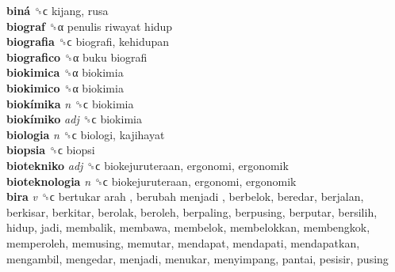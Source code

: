 \textbf{biná} ␝ϲ  kijang, rusa  \\
\textbf{biograf} ␝α   penulis riwayat hidup   \\
\textbf{biografia} ␝ϲ  biografi, kehidupan  \\
\textbf{biografico} ␝α   buku biografi   \\
\textbf{biokimica} ␝α  biokimia  \\
\textbf{biokimico} ␝α  biokimia  \\
\textbf{biokímika} \emph{n}  ␝ϲ  biokimia  \\
\textbf{biokímiko} \emph{adj}  ␝ϲ  biokimia  \\
\textbf{biologia} \emph{n}  ␝ϲ  biologi, kajihayat  \\
\textbf{biopsia} ␝ϲ  biopsi  \\
\textbf{biotekniko} \emph{adj}  ␝ϲ  biokejuruteraan, ergonomi, ergonomik  \\
\textbf{bioteknologia} \emph{n}  ␝ϲ  biokejuruteraan, ergonomi, ergonomik  \\
\textbf{bira} \emph{v}  ␝ϲ   bertukar arah ,  berubah menjadi , berbelok, beredar, berjalan, berkisar, berkitar, berolak, beroleh, berpaling, berpusing, berputar, bersilih, hidup, jadi, membalik, membawa, membelok, membelokkan, membengkok, memperoleh, memusing, memutar, mendapat, mendapati, mendapatkan, mengambil, mengedar, menjadi, menukar, menyimpang, pantai, pesisir, pusing  \\
